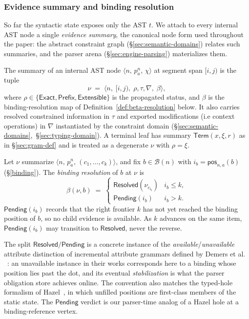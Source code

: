 \subsubsection{Evidence summary and binding resolution}
\label{sec:evidence-summary}

So far the syntactic state exposes only the AST $t$. We attach to every internal AST node a single \emph{evidence summary}, the canonical node form used throughout the paper: the abstract constraint graph (\S\ref{sec:semantic-domains}) relates such summaries, and the parser arena (\S\ref{sec:engine-parsing}) materializes them.

\begin{definition}
\label{def:evidence-summary}
The summary of an internal AST node $\langle n,\,p^n_a,\,\chi\rangle$ at segment span $[i,j)$ is the tuple
\[
  \nu \;=\; \langle n,\;[i,j),\;\rho,\tau, \nabla, \;\beta \rangle ,
\]
where $\rho \in \{\mathsf{Exact},\mathsf{Prefix},\mathsf{Extensible}\}$ is the propagated status, and $\beta$ is the binding-resolution map of Definition~\ref{def:beta-resolution} below. It also carries resolved constrained information in $\tau$ and exported modifications (i.e context operations) in $\nabla$ instantiated by the constraint domain (\S\ref{sec:semantic-domains},~\S\ref{sec:typing-domain}). A terminal leaf has summary $\mathsf{Term}(x,\xi,r)$ as in \S\ref{sec:gram-def} and is treated as a degenerate $\nu$ with $\rho = \xi$.
\end{definition}

\begin{definition}
\label{def:beta-resolution}
Let $\nu$ summarize $\langle n,\,p^n_a,\,(c_1,\ldots,c_k)\rangle$, and fix $b \in \mathcal{B}(n)$ with $i_b = \mathsf{pos}_{n,a}(b)$ (\S\ref{binding}). The \emph{binding resolution} of $b$ at $\nu$ is
\[
  \beta(\nu, b) \;=\;
  \begin{cases}
    \mathsf{Resolved}(\nu_{c_{i_b}}) & i_b \le k,\\[0.25em]
    \mathsf{Pending}(i_b)            & i_b > k.
  \end{cases}
\]
$\mathsf{Pending}(i_b)$ records that the right frontier $k$ has not yet reached the binding position of $b$, so no child evidence is available. As $k$ advances on the same item, $\mathsf{Pending}(i_b)$ may transition to $\mathsf{Resolved}$, never the reverse.
\end{definition}


The split $\mathsf{Resolved}/\mathsf{Pending}$ is a concrete instance of the \emph{available}/\emph{unavailable} attribute distinction of incremental attribute grammars defined by Demers et al. ~\cite{demers1981incremental}: an unavailable instance in their works corresponds here to a binding whose position lies past the dot, and its eventual \emph{stabilization} is what the parser obligation store achieves online. The convention also matches the typed-hole formalism of Hazel~\cite{omar2017hazelnut,zhao2024marking}, in which unfilled positions are first-class members of the static state. The $\mathsf{Pending}$ verdict is our parser-time analog of a Hazel hole at a binding-reference vertex.

